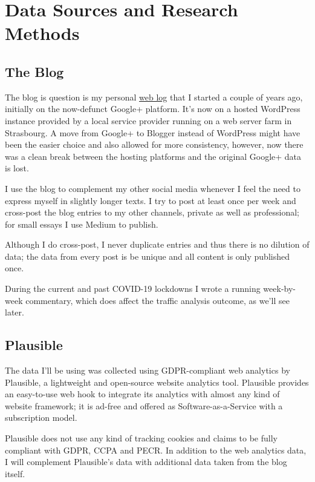 %
%

\pagebreak
\section{Data Sources and Research Methods}

\onehalfspacing

\subsection{The Blog}

The blog is question is my personal \href{https://chfrank.net/wordpress}{web log} that I started a couple of years ago, initially on the now-defunct Google+ platform. It's now on a hosted WordPress instance provided by a local service provider running on a web server farm in Strasbourg. A move from Google+ to Blogger instead of WordPress might have been the easier choice and also allowed for more consistency, however, now there was a clean break between the hosting platforms and the original Google+ data is lost.

I use the blog to complement my other social media whenever I feel the need to express myself in slightly longer texts. I try to post at least once per week and cross-post the blog entries to my other channels, private as well as professional; for small essays I use Medium to publish.

Although I do cross-post, I never duplicate entries and thus there is no dilution of data; the data from every post is be unique and all content is only published once.

During the current and past COVID-19 lockdowns I wrote a running week-by-week commentary, which does affect the traffic analysis outcome, as we'll see later.

\subsection{Plausible}

The data I'll be using was collected using GDPR-compliant web analytics by Plausible, a lightweight and open-source website analytics tool. Plausible provides an easy-to-use web hook to integrate its analytics with almost any kind of website framework; it is ad-free and offered as Software-as-a-Service with a subscription model.

Plausible does not use any kind of tracking cookies and claims to be fully compliant with GDPR, CCPA and PECR. In addition to the web analytics data, I will complement Plausible's data with additional data taken from the blog itself.


